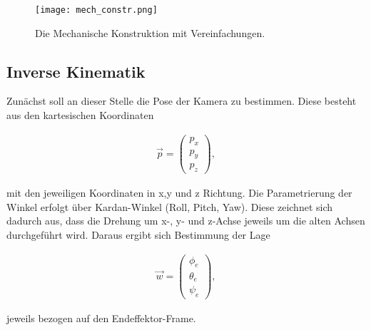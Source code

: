 \documentclass[a4paper, 12pt]{article}
\begin{document}
	\begin{figure}
		\centering
		\texttt{[image: mech\_constr.png]}
		\label{key}
		\caption{Die Mechanische Konstruktion mit Vereinfachungen.}
	\end{figure}

		\subsection{Inverse Kinematik}
		Zunächst soll an dieser Stelle die Pose der Kamera zu bestimmen. 
		Diese besteht aus den kartesischen Koordinaten
	
		\begin{align}
			\vec{p} = 
			\begin{pmatrix}
				p_x \\
				p_y \\
				p_z
			\end{pmatrix} , 
		\end{align}
	
		mit den jeweiligen Koordinaten in x,y und z Richtung.
		Die Parametrierung der Winkel erfolgt über Kardan-Winkel (Roll, Pitch, Yaw).
		Diese zeichnet sich dadurch aus, dass die Drehung um x-, y- und z-Achse jeweils um die alten Achsen durchgeführt wird.
		Daraus ergibt sich Bestimmung der Lage
	
		\begin{align}
			\vec{w}=
			\begin{pmatrix}
				\phi_e \\
				\theta_e \\
				\psi_e
			\end{pmatrix},
		\end{align}

		jeweils bezogen auf den Endeffektor-Frame.
	
		
\end{document}
